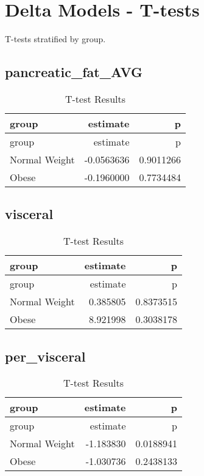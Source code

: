 \documentclass[
]{article}
\begin{document}
\hypertarget{delta-models---t-tests}{%
\section{Delta Models - T-tests}\label{delta-models---t-tests}}

T-tests stratified by group.

\hypertarget{pancreatic_fat_avg-2}{%
\subsection{pancreatic\_fat\_AVG}\label{pancreatic_fat_avg-2}}

\begin{longtable}[]{@{}lrr@{}}
\caption{T-test Results}\tabularnewline
\toprule()
group & estimate & p \\
\midrule()
\endfirsthead
\toprule()
group & estimate & p \\
\midrule()
\endhead
Normal Weight & -0.0563636 & 0.9011266 \\
Obese & -0.1960000 & 0.7734484 \\
\bottomrule()
\end{longtable}

\hypertarget{visceral-2}{%
\subsection{visceral}\label{visceral-2}}

\begin{longtable}[]{@{}lrr@{}}
\caption{T-test Results}\tabularnewline
\toprule()
group & estimate & p \\
\midrule()
\endfirsthead
\toprule()
group & estimate & p \\
\midrule()
\endhead
Normal Weight & 0.385805 & 0.8373515 \\
Obese & 8.921998 & 0.3038178 \\
\bottomrule()
\end{longtable}

\hypertarget{per_visceral-2}{%
\subsection{per\_visceral}\label{per_visceral-2}}

\begin{longtable}[]{@{}lrr@{}}
\caption{T-test Results}\tabularnewline
\toprule()
group & estimate & p \\
\midrule()
\endfirsthead
\toprule()
group & estimate & p \\
\midrule()
\endhead
Normal Weight & -1.183830 & 0.0188941 \\
Obese & -1.030736 & 0.2438133 \\
\bottomrule()
\end{longtable}
\end{document}
